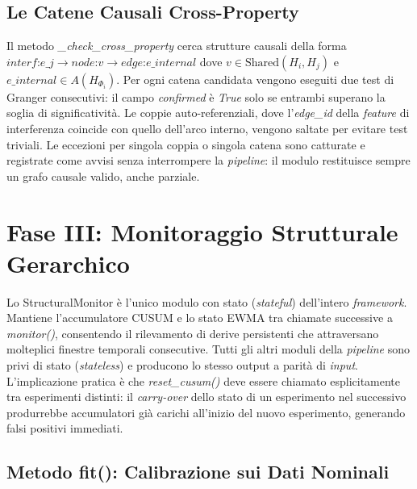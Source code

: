 \subsection{Le Catene Causali Cross-Property}
\label{subsec:cross_property_impl}

Il metodo \textit{\_check\_cross\_property} cerca strutture causali della forma
$\textit{interf:e\_j} \to \textit{node:v} \to \textit{edge:e\_internal}$ dove
$v \in \text{Shared}(H_i, H_j)$ e $\textit{e\_internal} \in A(H_{\Phi_i})$. Per ogni catena
candidata vengono eseguiti due test di Granger consecutivi: il campo \textit{confirmed} è
\textit{True} solo se entrambi superano la soglia di significatività. Le coppie auto-referenziali,
dove l'\textit{edge\_id} della \textit{feature} di interferenza coincide con quello dell'arco
interno, vengono saltate per evitare test triviali. Le eccezioni per singola coppia o singola
catena sono catturate e registrate come avvisi senza interrompere la \textit{pipeline}: il modulo
restituisce sempre un grafo causale valido, anche parziale.

\section{Fase III: Monitoraggio Strutturale Gerarchico}
\label{sec:impl_fase3}

Lo StructuralMonitor è l'unico modulo con stato (\textit{stateful}) dell'intero \textit{framework}.
Mantiene l'accumulatore \gls{CUSUM} e lo stato \gls{EWMA} tra chiamate successive a
\textit{monitor()}, consentendo il rilevamento di derive persistenti che attraversano molteplici
finestre temporali consecutive. Tutti gli altri moduli della \textit{pipeline} sono privi di
stato (\textit{stateless}) e producono lo stesso output a parità di \textit{input}.
L'implicazione pratica è che \textit{reset\_cusum()} deve essere chiamato esplicitamente tra
esperimenti distinti: il \textit{carry-over} dello stato di un esperimento nel successivo
produrrebbe accumulatori già carichi all'inizio del nuovo esperimento, generando falsi positivi
immediati.

\subsection{Metodo fit(): Calibrazione sui Dati Nominali}
\label{subsec:monitor_fit}

